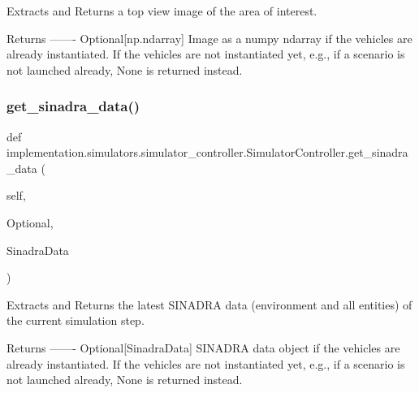 \begin{DoxyVerb}Extracts and Returns a top view image of the area of interest.

Returns
-------
Optional[np.ndarray]
    Image as a numpy ndarray if the vehicles are already instantiated. If the vehicles are not instantiated yet,
    e.g., if a scenario is not launched already, None is returned instead.
\end{DoxyVerb}
 \mbox{\label{classimplementation_1_1simulators_1_1simulator__controller_1_1_simulator_controller_a9f7953e17973cf3895b85dd132f56d5a}} 
\subsubsection{\texorpdfstring{get\+\_\+sinadra\+\_\+data()}{get\_sinadra\_data()}}
{\footnotesize\ttfamily def implementation.\+simulators.\+simulator\+\_\+controller.\+Simulator\+Controller.\+get\+\_\+sinadra\+\_\+data (\begin{DoxyParamCaption}\item[{}]{self,  }\item[{}]{Optional,  }\item[{}]{Sinadra\+Data }\end{DoxyParamCaption})}

\begin{DoxyVerb}Extracts and Returns the latest SINADRA data (environment and all entities) of the current simulation
step.

Returns
-------
Optional[SinadraData]
    SINADRA data object if the vehicles are already instantiated. If the vehicles are not instantiated yet,
    e.g., if a scenario is not launched already, None is returned instead.
\end{DoxyVerb}
 \mbox{\label{classimplementation_1_1simulators_1_1simulator__controller_1_1_simulator_controller_a3f8215746649fb87dae9308e663ebd88}} 

